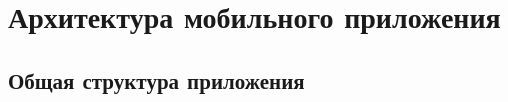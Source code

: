 
\section{Архитектура мобильного приложения} %
\label{sec:arch}


\subsection{Общая структура приложения}
\label{sub:arch:struct}


